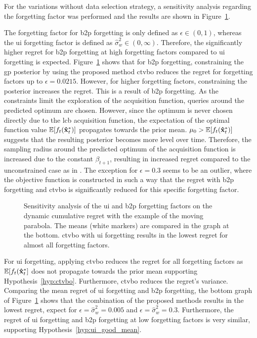 For the variations without data selection strategy, a sensitivity analysis regarding the forgetting factor was performed and the results are shown in Figure~\ref{fig:Parabola1D_forgetting_factors}.

The forgetting factor for \gls{b2p} forgetting is only defined as $\epsilon \in (0, 1)$, whereas the \gls{ui} forgetting factor is defined as $\hat{\sigma}_w^2 \in (0, \infty)$. Therefore, the significantly higher regret for \gls{b2p} forgetting at high forgetting factors compared to \gls{ui} forgetting is expected. Figure~\ref{fig:Parabola1D_forgetting_factors} shows that for \gls{b2p} forgetting, constraining the \gls{gp} posterior by using the proposed method \gls{ctvbo} reduces the regret for forgetting factors up to $\epsilon = 0.0215$. However, for higher forgetting factors, constraining the posterior increases the regret. This is a result of \gls{b2p} forgetting. As the constraints limit the exploration of the acquisition function, queries around the predicted optimum are chosen. However, since the optimum is never chosen directly due to the \gls{lcb} acquisition function, the expectation of the optimal function value $\operatorname{\mathbb{E}}[f_t(\mathbf{\hat{x}}_t^*)]$ propagates towards the prior mean. $\mu_0 > \operatorname{\mathbb{E}}[f_t(\mathbf{\hat{x}}_t^*)]$ suggests that the resulting posterior becomes more level over time. Therefore, the sampling radius around the predicted optimum of the acquisition function is increased due to the constant $\beta_{t+1}$, resulting in increased regret compared to the unconstrained case as in .
The exception for $\epsilon = 0.3$ seems to be an outlier, where the objective function is constructed in such a way that the regret with \gls{b2p} forgetting and \gls{ctvbo} is significantly reduced for this specific forgetting factor.
\begin{figure}[h!]
    \centering
    
    \caption[Sensitivity analysis of the forgetting factors of \gls{ui} and \gls{b2p} forgetting.]{Sensitivity analysis of the \gls{ui} and \gls{b2p} forgetting factors on the dynamic cumulative regret with the example of the moving parabola. The means (white markers) are compared in the graph at the bottom. \gls{ctvbo} with \gls{ui} forgetting results in the lowest regret for almost all forgetting factors.}
    \label{fig:Parabola1D_forgetting_factors}
\end{figure}

For \gls{ui} forgetting, applying \gls{ctvbo} reduces the regret for all forgetting factors as $\operatorname{\mathbb{E}}[f_t(\mathbf{\hat{x}}_t^*]$ does not propagate towards the prior mean supporting  Hypothesis~\ref{hyp:ctvbo}. Furthermore, \gls{ctvbo} reduces the regret's variance. Comparing the mean regret of \gls{ui} forgetting and \gls{b2p} forgetting, the bottom graph of Figure~\ref{fig:Parabola1D_forgetting_factors} shows that the combination of the proposed methods results in the lowest regret, expect for $\epsilon=\hat{\sigma}_w^2 = 0.005$ and $\epsilon=\hat{\sigma}_w^2 = 0.3$. Furthermore, the regret of \gls{ui} forgetting and \gls{b2p} forgetting at low forgetting factors is very similar, supporting  Hypothesis~\ref{hyp:ui_good_mean}.


